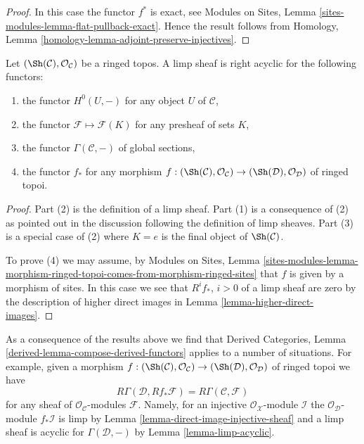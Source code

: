 \begin{proof}
In this case the functor $f^*$ is exact, see
Modules on Sites, Lemma \ref{sites-modules-lemma-flat-pullback-exact}.
Hence the result follows from
Homology, Lemma \ref{homology-lemma-adjoint-preserve-injectives}.
\end{proof}

\begin{lemma}
\label{lemma-limp-acyclic}
Let $(\Sh(\mathcal{C}), \mathcal{O}_\mathcal{C})$ be a ringed topos.
A limp sheaf is right acyclic for the following functors:
\begin{enumerate}
\item the functor $H^0(U, -)$ for any object $U$ of $\mathcal{C}$,
\item the functor $\mathcal{F} \mapsto \mathcal{F}(K)$ for any
presheaf of sets $K$,
\item the functor $\Gamma(\mathcal{C}, -)$ of global sections,
\item the functor $f_*$ for any morphism
$f : (\Sh(\mathcal{C}), \mathcal{O}_\mathcal{C}) \to
(\Sh(\mathcal{D}), \mathcal{O}_\mathcal{D})$ of ringed topoi.
\end{enumerate}
\end{lemma}

\begin{proof}
Part (2) is the definition of a limp sheaf.
Part (1) is a consequence of (2) as pointed out in the discussion following the
definition of limp sheaves.
Part (3) is a special case of (2) where $K = e$ is the final object
of $\Sh(\mathcal{C})$.

\medskip\noindent
To prove (4) we may assume, by
Modules on Sites, Lemma
\ref{sites-modules-lemma-morphism-ringed-topoi-comes-from-morphism-ringed-sites}
that $f$ is given by a morphism of sites. In this case we see that
$R^if_*$, $i > 0$ of a limp sheaf are zero by the description of
higher direct images in
Lemma \ref{lemma-higher-direct-images}.
\end{proof}

\begin{remark}
\label{remark-before-Leray}
As a consequence of the results above we find that
Derived Categories, Lemma \ref{derived-lemma-compose-derived-functors}
applies to a number of situations. For example, given a
morphism $f : (\Sh(\mathcal{C}), \mathcal{O}_\mathcal{C}) \to
(\Sh(\mathcal{D}), \mathcal{O}_\mathcal{D})$ of ringed topoi we have
$$
R\Gamma(\mathcal{D}, Rf_*\mathcal{F}) = R\Gamma(\mathcal{C}, \mathcal{F})
$$
for any sheaf of $\mathcal{O}_\mathcal{C}$-modules $\mathcal{F}$.
Namely, for an injective $\mathcal{O}_\mathcal{X}$-module $\mathcal{I}$
the $\mathcal{O}_\mathcal{D}$-module $f_*\mathcal{I}$ is limp by
Lemma \ref{lemma-direct-image-injective-sheaf}
and a limp sheaf is acyclic for $\Gamma(\mathcal{D}, -)$ by
Lemma \ref{lemma-limp-acyclic}.
\end{remark}

